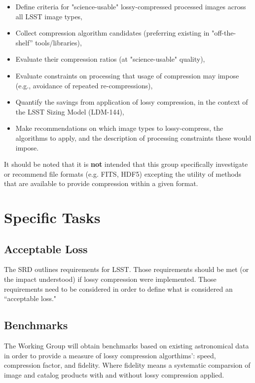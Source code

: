 \begin{itemize}
    \item Define criteria for "science-usable" lossy-compressed processed images across all LSST image types,
    \item Collect compression algorithm candidates (preferring existing in "off-the-shelf” tools/libraries),
    \item Evaluate their compression ratios (at "science-usable" quality),
    \item Evaluate constraints on processing that usage of compression may impose (e.g., avoidance of repeated re-compressions),
    \item Quantify the savings from application of lossy compression, in the context of the LSST Sizing Model (LDM-144),
    \item Make recommendations on which image types to lossy-compress, the algorithms to apply, and the description of processing constraints these would impose.
\end{itemize}

It should be noted that it is \textbf{not} intended that this group specifically
investigate or recommend file formats (e.g. FITS, HDF5) excepting the utility 
of methods that are available to provide compression within a given format.


\section{Specific Tasks}

\subsection{Acceptable Loss}

The SRD outlines requirements for LSST.  Those requirements should be met 
(or the impact understood) if lossy compression were implemented.  Those 
requirements need to be considered in order to define what is considered 
an ``acceptable loss."

\subsection{Benchmarks}

The Working Group will obtain benchmarks based on existing astronomical data in order 
to provide a measure of lossy compression algorthims': speed, compression factor, 
and fidelity.  Where fidelity means a systematic comparsion of image and catalog 
products with and without lossy compression applied.

